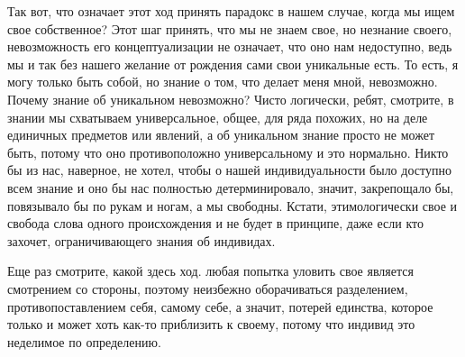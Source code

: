 
Так вот, что означает этот ход принять
парадокс в нашем случае, когда мы ищем свое собственное? Этот шаг принять, что
мы не знаем свое, но незнание своего, невозможность его концептуализации не
означает, что оно нам недоступно, ведь мы и так без нашего желание от рождения
сами свои уникальные есть. То есть, я могу только быть собой, но знание о том,
что делает меня мной, невозможно. Почему знание об уникальном невозможно? Чисто
логически, ребят, смотрите, в знании мы схватываем универсальное, общее, для
ряда похожих, но на деле единичных предметов или явлений, а об уникальном знание
просто не может быть, потому что оно противоположно универсальному и это
нормально. Никто бы из нас, наверное, не хотел, чтобы о нашей индивидуальности
было доступно всем знание и оно бы нас полностью детерминировало, значит,
закрепощало бы, повязывало бы по рукам и ногам, а мы свободны. Кстати,
этимологически свое и свобода слова одного происхождения и не будет в принципе,
даже если кто захочет, ограничивающего знания об индивидах. 

Еще раз смотрите,
какой здесь ход. любая попытка уловить свое является смотрением со стороны,
поэтому неизбежно оборачиваться разделением, противопоставлением себя, самому
себе, а значит, потерей единства, которое только и может хоть как-то приблизить
к своему, потому что индивид это неделимое по определению. 



